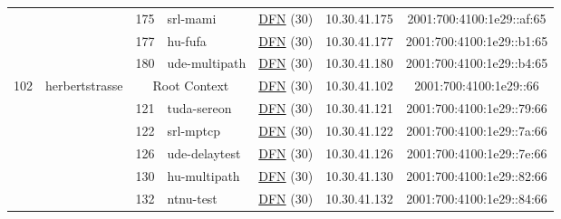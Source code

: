 \begin{small}
\begin{center}
\begin{longtable}{|c|c|c|c|c|c|c|c|}
  &  & \tiny{175} & \multicolumn{1}{|l|}{\tiny{srl-mami}} & \multicolumn{2}{|c|}{\tiny{\href{https://www.dfn.de}{DFN} (30)}} & \tiny{10.30.41.175} & \tiny{2001:700:4100:1e29::af:65} \\* \cline{3-3}\cline{4-4}\cline{5-5}\cline{6-6}\cline{7-7}\cline{8-8}
  &  & \tiny{177} & \multicolumn{1}{|l|}{\tiny{hu-fufa}} & \multicolumn{2}{|c|}{\tiny{\href{https://www.dfn.de}{DFN} (30)}} & \tiny{10.30.41.177} & \tiny{2001:700:4100:1e29::b1:65} \\* \cline{3-3}\cline{4-4}\cline{5-5}\cline{6-6}\cline{7-7}\cline{8-8}
  &  & \tiny{180} & \multicolumn{1}{|l|}{\tiny{ude-multipath}} & \multicolumn{2}{|c|}{\tiny{\href{https://www.dfn.de}{DFN} (30)}} & \tiny{10.30.41.180} & \tiny{2001:700:4100:1e29::b4:65} \\ \hline
 \multirow{15}{*}{\tiny{102}} & \multicolumn{1}{|l|}{\multirow{15}{*}{\tiny{herbertstrasse}}} & \multicolumn{2}{|c|}{\tiny{Root Context}} & \multicolumn{2}{|c|}{\tiny{\href{https://www.dfn.de}{DFN} (30)}} & \tiny{10.30.41.102} & \tiny{2001:700:4100:1e29::66} \\* \cline{3-3}\cline{4-4}\cline{5-5}\cline{6-6}\cline{7-7}\cline{8-8}
  &  & \tiny{121} & \multicolumn{1}{|l|}{\tiny{tuda-sereon}} & \multicolumn{2}{|c|}{\tiny{\href{https://www.dfn.de}{DFN} (30)}} & \tiny{10.30.41.121} & \tiny{2001:700:4100:1e29::79:66} \\* \cline{3-3}\cline{4-4}\cline{5-5}\cline{6-6}\cline{7-7}\cline{8-8}
  &  & \tiny{122} & \multicolumn{1}{|l|}{\tiny{srl-mptcp}} & \multicolumn{2}{|c|}{\tiny{\href{https://www.dfn.de}{DFN} (30)}} & \tiny{10.30.41.122} & \tiny{2001:700:4100:1e29::7a:66} \\* \cline{3-3}\cline{4-4}\cline{5-5}\cline{6-6}\cline{7-7}\cline{8-8}
  &  & \tiny{126} & \multicolumn{1}{|l|}{\tiny{ude-delaytest}} & \multicolumn{2}{|c|}{\tiny{\href{https://www.dfn.de}{DFN} (30)}} & \tiny{10.30.41.126} & \tiny{2001:700:4100:1e29::7e:66} \\* \cline{3-3}\cline{4-4}\cline{5-5}\cline{6-6}\cline{7-7}\cline{8-8}
  &  & \tiny{130} & \multicolumn{1}{|l|}{\tiny{hu-multipath}} & \multicolumn{2}{|c|}{\tiny{\href{https://www.dfn.de}{DFN} (30)}} & \tiny{10.30.41.130} & \tiny{2001:700:4100:1e29::82:66} \\* \cline{3-3}\cline{4-4}\cline{5-5}\cline{6-6}\cline{7-7}\cline{8-8}
  &  & \tiny{132} & \multicolumn{1}{|l|}{\tiny{ntnu-test}} & \multicolumn{2}{|c|}{\tiny{\href{https://www.dfn.de}{DFN} (30)}} & \tiny{10.30.41.132} & \tiny{2001:700:4100:1e29::84:66} \\* \cline{3-3}\cline{4-4}\cline{5-5}\cline{6-6}\cline{7-7}\cline{8-8}

\end{longtable}
\end{center}
\end{small}
